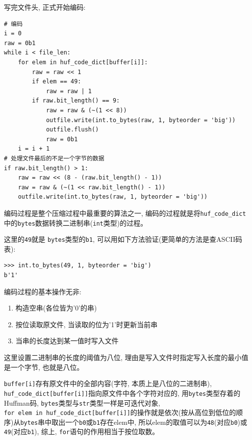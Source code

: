 \documentclass{ctexart}
\begin{document}
写完文件头, 正式开始编码:

{\setmainfont{Courier New Bold}              
\begin{lstlisting}
# 编码
i = 0
raw = 0b1
while i < file_len:
    for elem in huf_code_dict[buffer[i]]:
        raw = raw << 1
        if elem == 49:
            raw = raw | 1
        if raw.bit_length() == 9:
            raw = raw & (~(1 << 8))
            outfile.write(int.to_bytes(raw, 1, byteorder = 'big'))
            outfile.flush()
            raw = 0b1
    i = i + 1
# 处理文件最后的不足一个字节的数据
if raw.bit_length() > 1:
    raw = raw << (8 - (raw.bit_length() - 1))
    raw = raw & (~(1 << raw.bit_length() - 1))
    outfile.write(int.to_bytes(raw, 1, byteorder = 'big'))
\end{lstlisting}}

编码过程是整个压缩过程中最重要的算法之一, 编码的过程就是将\texttt{huf\_code\_dict}中的\texttt{bytes}数据转换二进制串(\texttt{int}类型)的过程。

这里的\texttt{49}就是 \texttt{bytes}类型的\texttt{b\textquotesingle{}1\textquotesingle{}},
可以用如下方法验证(更简单的方法是查ASCII码表):

{\setmainfont{Courier New Bold}              
\begin{lstlisting}
>>> int.to_bytes(49, 1, byteorder = 'big')
b'1'
\end{lstlisting}}

编码过程的基本操作无非:

\begin{enumerate}
\def\labelenumi{\arabic{enumi}.}
\item
  构造空串(各位皆为'0'的串)
\item
  按位读取原文件, 当读取的位为'1'时更新当前串
\item
  当串的长度达到某一值时写入文件
\end{enumerate}

这里设置二进制串的长度的阈值为八位, 理由是写入文件时指定写入长度的最小值是一个字节, 也就是八位。

\texttt{buffer{[}i{]}}存有原文件中的全部内容(字符, 本质上是八位的二进制串), \texttt{huf\_code\_dict{[}buffer{[}i{]}{]}}指向原文件中各个字符对应的, 用\texttt{bytes}类型存着的Huffman码, \texttt{bytes}类型与\texttt{str}类型一样是可迭代对象, \texttt{for\ elem\ in\ huf\_code\_dict{[}buffer{[}i{]}{]}}的操作就是依次(按从高位到低位的顺序)从\texttt{bytes}串中取出一个\texttt{b\textquotesingle{}0\textquotesingle{}}或\texttt{b\textquotesingle{}1\textquotesingle{}}存在elem中, 所以elem的取值可以为\texttt{48}(对应\texttt{b\textquotesingle{}0\textquotesingle{}})或\texttt{49}(对应\texttt{b\textquotesingle{}1\textquotesingle{}}), 综上, \texttt{for}语句的作用相当于按位取数。
\end{document}
